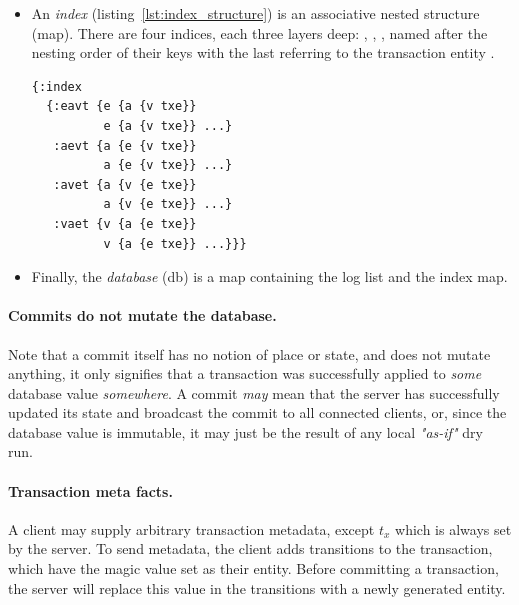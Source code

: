 \begin{itemize}
\cleardoublepage
\item An \emph{index} (listing~\ref{lst:index_structure}) is an associative nested structure (map). There are four indices, each three layers deep: , , , named after the nesting order of their keys with the last  referring to the transaction entity .

\begin{lstlisting}[label={lst:index_structure},morekeywords={:+,:-,txe},caption=Structure of the indices]
{:index
  {:eavt {e {a {v txe}}
          e {a {v txe}} ...}
   :aevt {a {e {v txe}}
          a {e {v txe}} ...}
   :avet {a {v {e txe}}
          a {v {e txe}} ...}
   :vaet {v {a {e txe}}
          v {a {e txe}} ...}}}
\end{lstlisting}

\item Finally, the \emph{database} (db) is a map containing the log list and the index map.

\begin{center}
\end{center}

\end{itemize}

\paragraph{Commits do not mutate the database.}
Note that a commit itself has no notion of place or state, and does not mutate anything, it only signifies that a transaction was successfully applied to \emph{some} database value \emph{somewhere}. A commit \emph{may} mean that the server has successfully updated its state and broadcast the commit to all connected clients, or, since the database value is immutable, it may just be the result of any local \emph{"as-if"} dry run.

\paragraph{Transaction meta facts.}
A client may supply arbitrary transaction metadata, except $t_x$ which is always set by the server. To send metadata, the client adds transitions to the transaction, which have the magic value  set as their entity. Before committing a transaction, the server will replace this value in the transitions with a newly generated entity.

\cleardoublepage
